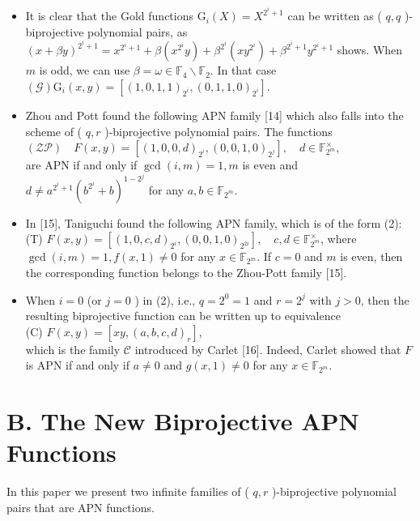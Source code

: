 \documentclass[10pt]{article}
\begin{document}
\begin{itemize}
  \item It is clear that the Gold functions $\mathrm{G}_{i}(X)=X^{2^{i}+1}$ can be written as ( $q, q$ )-biprojective polynomial pairs, as\\
$(x+\beta y)^{2^{i}+1}=x^{2^{i}+1}+\beta\left(x^{2^{i}} y\right)+\beta^{2^{i}}\left(x y^{2^{i}}\right)+\beta^{2^{i}+1} y^{2^{i}+1}$ shows. When $m$ is odd, we can use $\beta=\omega \in \mathbb{F}_{4} \backslash \mathbb{F}_{2}$. In that case\\
$(\mathcal{G}) \mathrm{G}_{i}(x, y)=\left[(1,0,1,1)_{2^{i}},(0,1,1,0)_{2^{i}}\right]$.
  \item Zhou and Pott found the following APN family [14] which also falls into the scheme of ( $q, r$ )-biprojective polynomial pairs. The functions\\
$(\mathcal{Z} \mathcal{P}) \quad F(x, y)=\left[(1,0,0, d)_{2^{i}},(0,0,1,0)_{2^{j}}\right], \quad d \in \mathbb{F}_{2^{m}}^{\times}$,\\
are APN if and only if $\operatorname{gcd}(i, m)=1, m$ is even and $d \neq a^{2^{i}+1}\left(b^{2^{i}}+b\right)^{1-2^{j}}$ for any $a, b \in \mathbb{F}_{2^{m}}$.
  \item In [15], Taniguchi found the following APN family, which is of the form (2):\\
(T) $F(x, y)=\left[(1,0, c, d)_{2^{i}},(0,0,1,0)_{2^{2 i}}\right], \quad c, d \in \mathbb{F}_{2^{m}}^{\times}$, where $\operatorname{gcd}(i, m)=1, f(x, 1) \neq 0$ for any $x \in \mathbb{F}_{2^{m}}$. If $c=0$ and $m$ is even, then the corresponding function belongs to the Zhou-Pott family [15].
  \item When $i=0$ (or $j=0$ ) in (2), i.e., $q=2^{0}=1$ and $r=2^{j}$ with $j>0$, then the resulting biprojective function can be written up to equivalence\\
(C) $F(x, y)=\left[x y,(a, b, c, d)_{r}\right]$,\\
which is the family $\mathcal{C}$ introduced by Carlet [16]. Indeed, Carlet showed that $F$ is APN if and only if $a \neq 0$ and $g(x, 1) \neq 0$ for any $x \in \mathbb{F}_{2^{m}}$.
\end{itemize}

\section*{B. The New Biprojective APN Functions}
In this paper we present two infinite families of ( $q, r$ )-biprojective polynomial pairs that are APN functions.
\end{document}
